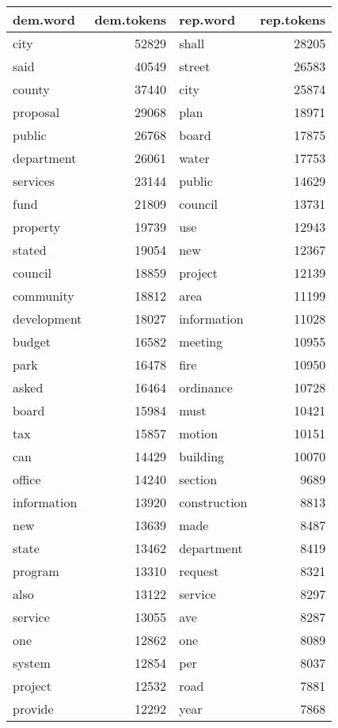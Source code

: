 \begin{table}[ht]
\centering
\begin{tabular}{lrlr}
  \hline
dem.word & dem.tokens & rep.word & rep.tokens \\ 
  \hline
city & 52829 & shall & 28205 \\ 
  said & 40549 & street & 26583 \\ 
  county & 37440 & city & 25874 \\ 
  proposal & 29068 & plan & 18971 \\ 
  public & 26768 & board & 17875 \\ 
  department & 26061 & water & 17753 \\ 
  services & 23144 & public & 14629 \\ 
  fund & 21809 & council & 13731 \\ 
  property & 19739 & use & 12943 \\ 
  stated & 19054 & new & 12367 \\ 
  council & 18859 & project & 12139 \\ 
  community & 18812 & area & 11199 \\ 
  development & 18027 & information & 11028 \\ 
  budget & 16582 & meeting & 10955 \\ 
  park & 16478 & fire & 10950 \\ 
  asked & 16464 & ordinance & 10728 \\ 
  board & 15984 & must & 10421 \\ 
  tax & 15857 & motion & 10151 \\ 
  can & 14429 & building & 10070 \\ 
  office & 14240 & section & 9689 \\ 
  information & 13920 & construction & 8813 \\ 
  new & 13639 & made & 8487 \\ 
  state & 13462 & department & 8419 \\ 
  program & 13310 & request & 8321 \\ 
  also & 13122 & service & 8297 \\ 
  service & 13055 & ave & 8287 \\ 
  one & 12862 & one & 8089 \\ 
  system & 12854 & per & 8037 \\ 
  project & 12532 & road & 7881 \\ 
  provide & 12292 & year & 7868 \\ 
   \hline
\end{tabular}
\end{table}


